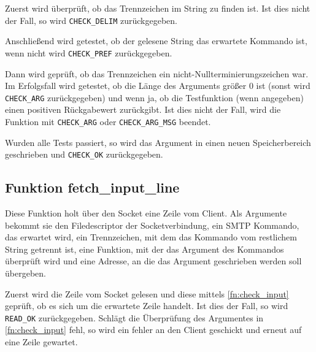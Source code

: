 \documentclass[pdftex,final,a4paper,10pt,notitlepage,halfparskip]{scrreprt}
\begin{document}
Zuerst wird überprüft, ob das Trennzeichen im String zu finden ist. Ist dies nicht der Fall, so wird \texttt{CHECK\_DELIM} zurückgegeben.

Anschließend wird getestet, ob der gelesene String das erwartete Kommando ist, wenn nicht wird \texttt{CHECK\_PREF} zurückgegeben.

Dann wird geprüft, ob das Trennzeichen ein nicht-Nullterminierungszeichen war. Im Erfolgsfall wird getestet, ob die Länge des Arguments größer 0 ist (sonst wird \texttt{CHECK\_ARG} zurückgegeben) und wenn ja, ob die Testfunktion (wenn angegeben) einen positiven Rückgabewert zurückgibt. Ist dies nicht der Fall, wird die Funktion mit \texttt{CHECK\_ARG} oder \texttt{CHECK\_ARG\_MSG} beendet.

Wurden alle Tests passiert, so wird das Argument in einen neuen Speicherbereich geschrieben und \texttt{CHECK\_OK} zurückgegeben.

\subsection{Funktion fetch\_input\_line}\label{fn:fetch_input_line}
Diese Funktion holt über den Socket eine Zeile vom Client. Als Argumente bekommt sie den Filedescriptor der Socketverbindung, ein SMTP Kommando, das erwartet wird, ein Trennzeichen, mit dem das Kommando vom restlichem String getrennt ist, eine Funktion, mit der das Argument des Kommandos überprüft wird und eine Adresse, an die das Argument geschrieben werden soll übergeben.

Zuerst wird die Zeile vom Socket gelesen und diese mittels \ref{fn:check_input} geprüft, ob es sich um die erwartete Zeile handelt. Ist dies der Fall, so wird \texttt{READ\_OK} zurückgegeben. Schlägt die Überprüfung des Argumentes in \ref{fn:check_input} fehl, so wird ein fehler an den Client geschickt und erneut auf eine Zeile gewartet.
\end{document}

